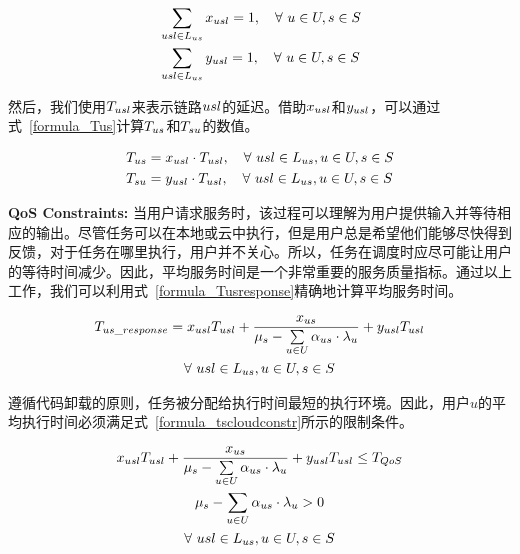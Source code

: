 \begin{equation}
\label{formula_xusl1}
\begin{aligned}
&\sum_{usl\in L_{us}}x_{usl} = 1, \quad \forall \ u\in U, s\in S\\
&\sum_{usl\in L_{us}}y_{usl} = 1, \quad \forall \ u\in U, s\in S\\
\end{aligned}
\end{equation}

然后，我们使用$T_{usl}$来表示链路$usl$的延迟。借助$x_{usl}$和$y_{usl}$，可以通过式~\eqref{formula_Tus}计算${T}_{us}$和${T}_{su}$的数值。

\begin{equation}
\label{formula_Tus}
\begin{aligned}
&{T}_{us} = x_{usl} \cdot T_{usl}, \quad \forall \ usl\in L_{us}, u\in U, s\in S\\
&{T}_{su} = y_{usl} \cdot T_{usl}, \quad \forall \ usl\in L_{us}, u\in U, s\in S\\
\end{aligned}
\end{equation}

\textbf{QoS Constraints:}
当用户请求服务时，该过程可以理解为用户提供输入并等待相应的输出。尽管任务可以在本地或云中执行，但是用户总是希望他们能够尽快得到反馈，对于任务在哪里执行，用户并不关心。所以，任务在调度时应尽可能让用户的等待时间减少。因此，平均服务时间是一个非常重要的服务质量指标。通过以上工作，我们可以利用式~\ref{formula_Tusresponse}精确地计算平均服务时间。

\begin{equation}
\label{formula_Tusresponse}
\begin{gathered}
{T}_{us\_response} = x_{usl} T_{usl} + \frac{{x}_{us}}{{\mu}_{s}-\sum\limits_{u \in U}{\alpha}_{us} \cdot {\lambda}_{u}} + y_{usl} T_{usl}\\
\forall \ usl\in L_{us}, u\in U, s\in S\\
\end{gathered}
\end{equation}

遵循代码卸载的原则，任务被分配给执行时间最短的执行环境。因此，用户$u$的平均执行时间必须满足式~\eqref{formula_tscloudconstr}所示的限制条件。

\begin{equation}
\label{formula_tscloudconstr}
\begin{gathered}
x_{usl} T_{usl} + \frac{{x}_{us}}{{\mu}_{s}-\sum\limits_{u \in U}{\alpha}_{us} \cdot {\lambda}_{u}} + y_{usl} T_{usl} \leq T_{QoS}\\
{\mu}_{s}-\sum\limits_{u \in U}{\alpha}_{us} \cdot {\lambda}_{u} > 0\\
\forall \ usl\in L_{us}, u\in U, s\in S\\
\end{gathered}
\end{equation}

